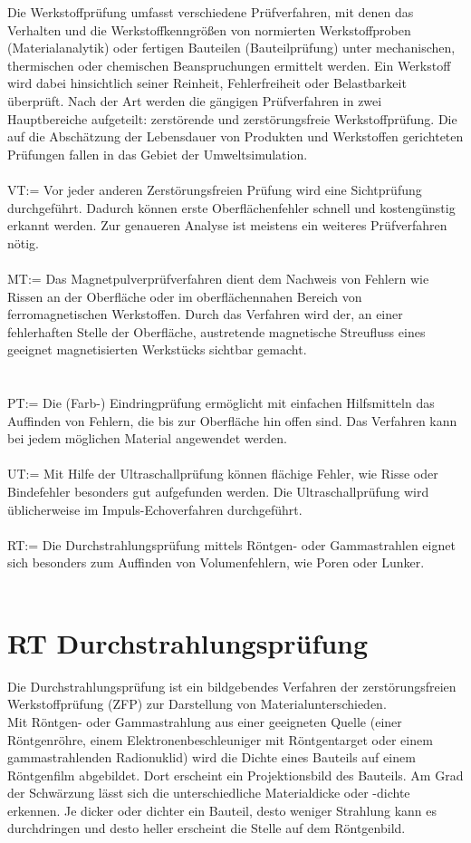 Die Werkstoffprüfung umfasst verschiedene Prüfverfahren, mit denen das Verhalten und die
Werkstoffkenngrößen von normierten Werkstoffproben (Materialanalytik) oder fertigen Bauteilen
(Bauteilprüfung) unter mechanischen, thermischen oder chemischen Beanspruchungen ermittelt
werden.
Ein Werkstoff wird dabei hinsichtlich seiner Reinheit, Fehlerfreiheit oder Belastbarkeit überprüft. Nach
der Art werden die gängigen Prüfverfahren in zwei Hauptbereiche aufgeteilt: zerstörende und
zerstörungsfreie Werkstoffprüfung. Die auf die Abschätzung der Lebensdauer von Produkten und
Werkstoffen gerichteten Prüfungen fallen in das Gebiet der Umweltsimulation.\\
\\
VT:= Vor jeder anderen Zerstörungsfreien Prüfung wird eine Sichtprüfung durchgeführt. Dadurch
können erste Oberflächenfehler schnell und kostengünstig erkannt werden. Zur genaueren Analyse
ist meistens ein weiteres Prüfverfahren nötig.\\
\\
MT:= Das Magnetpulverprüfverfahren dient dem Nachweis von Fehlern wie Rissen an der Oberfläche
oder im oberflächennahen Bereich von ferromagnetischen Werkstoffen. Durch das Verfahren wird
der, an einer fehlerhaften Stelle der Oberfläche, austretende magnetische Streufluss eines geeignet
magnetisierten Werkstücks sichtbar gemacht.\\
\\
\\
PT:= Die (Farb-) Eindringprüfung ermöglicht mit einfachen Hilfsmitteln das Auffinden von Fehlern, die
bis zur Oberfläche hin offen sind. Das Verfahren kann bei jedem möglichen Material angewendet
werden.\\
\\
UT:= Mit Hilfe der Ultraschallprüfung können flächige Fehler, wie Risse oder Bindefehler besonders
gut aufgefunden werden. Die Ultraschallprüfung wird üblicherweise im Impuls-Echoverfahren
durchgeführt.\\
\\
RT:= Die Durchstrahlungsprüfung mittels Röntgen- oder Gammastrahlen eignet sich besonders zum
Auffinden von Volumenfehlern, wie Poren oder Lunker.\\
\\
\section{RT Durchstrahlungsprüfung}
\label{subsec:ndt}
Die Durchstrahlungsprüfung ist ein bildgebendes Verfahren der zerstörungsfreien Werkstoffprüfung (ZFP) zur Darstellung von Materialunterschieden.\\
Mit Röntgen- oder Gammastrahlung aus einer geeigneten Quelle (einer Röntgenröhre, einem Elektronenbeschleuniger mit Röntgentarget oder einem gammastrahlenden Radionuklid) wird die Dichte eines Bauteils auf einem Röntgenfilm abgebildet. Dort erscheint ein Projektionsbild des Bauteils. Am Grad der Schwärzung lässt sich die unterschiedliche Materialdicke oder -dichte erkennen. Je dicker oder dichter ein Bauteil, desto weniger Strahlung kann es durchdringen und desto heller erscheint die Stelle auf dem Röntgenbild.\\
\\
